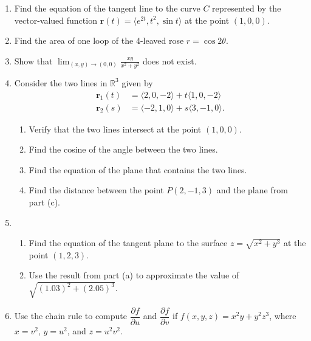 \documentclass[12pt]{article}
\newcommand{\points}[1]{\marginpar{\hspace{24pt}[#1]}}
\newcommand{\di}{\displaystyle}
\newcommand{\R}{\mathbb{R}}
\begin{document}
\begin{enumerate}
\item Find the equation of the tangent line to the curve $C$ represented by the vector-valued function $\mathbf{r}(t) = \langle e^{2t}, t^2, \sin t\rangle$ at the point $(1,0,0)$.\points{4}

\vspace{2.5in}

\item Find the area of one loop of the 4-leaved rose $r=\cos 2\theta$. \points{5}

\vspace{3in}

\item Show that $\di \lim_{(x,y)\to (0,0)}\frac{xy}{x^2+y^2}$ does not exist. \points{3}
\newpage

\item Consider the two lines in $\R^3$ given by
\begin{align*}
\mathbf{r}_1(t) & = \langle 2,0,-2\rangle + t\langle 1,0,-2\rangle\\
\mathbf{r}_2(s) & = \langle -2,1,0\rangle +s\langle 3,-1,0\rangle.
\end{align*}
\begin{enumerate}
\item Verify that the two lines intersect at the point $(1,0,0)$. \points{2}

\vspace{1.2in}

\item Find the cosine of the angle between the two lines. \points{3}

\vspace{1.3in}

\item Find the equation of the plane that contains the two lines. \points{4}

\vspace{2in}

\item Find the distance between the point $P(2,-1,3)$ and the plane from part (c).\points{3}
\end{enumerate}
\newpage


\item \begin{enumerate}
\item Find the equation of the tangent plane to the surface $z=\sqrt{x^2+y^3}$ at the point $(1,2,3)$. \points{5}

\vspace{3in}

\item Use the result from part (a) to approximate the value of $\sqrt{(1.03)^2+(2.05)^3}$. \points{2}

\vspace{1.5in}
\end{enumerate} 



\item Use the chain rule to compute $\dfrac{\partial f}{\partial u}$ and $\dfrac{\partial f}{\partial v}$ if $f(x,y,z) = x^2y+y^2z^3$, where $x = v^2$, $y=u^2$, and $z=u^2v^2$. \points{5}
\end{enumerate}
\end{document}
